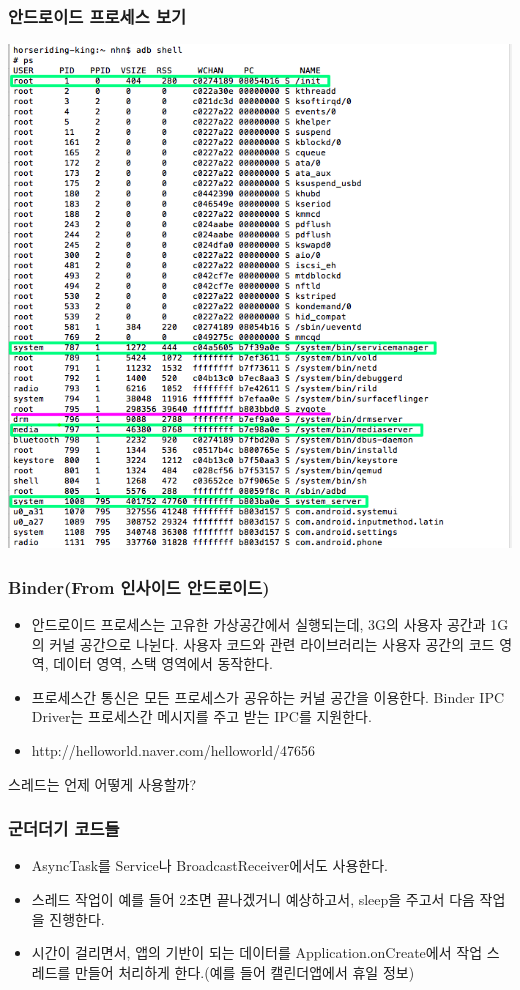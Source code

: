 \documentclass{beamer}
\begin{document}
\begin{frame}
\frametitle{안드로이드 프로세스 보기}
\includegraphics[scale=0.3]{ps}
\end{frame}

\begin{frame}
\frametitle{Binder(From 인사이드 안드로이드)}
\begin{itemize}
\item 안드로이드 프로세스는 고유한 가상공간에서 실행되는데, 3G의 사용자 공간과 1G의 커널 공간으로 나뉜다. 사용자 코드와 관련 라이브러리는 사용자 공간의 코드 영역, 데이터 영역, 스택 영역에서 동작한다.
\item 프로세스간 통신은 모든 프로세스가 공유하는 커널 공간을 이용한다. Binder IPC Driver는 프로세스간 메시지를 주고 받는 IPC를 지원한다. 
\item http://helloworld.naver.com/helloworld/47656
\end{itemize}
\end{frame}

\begin{frame}
스레드는 언제 어떻게 사용할까?
\end{frame}

\begin{frame}
\frametitle{군더더기 코드들}
\begin{itemize}
\item AsyncTask를 Service나 BroadcastReceiver에서도 사용한다. 
\item 스레드 작업이 예를 들어 2초면 끝나겠거니 예상하고서, sleep을 주고서 다음 작업을 진행한다.
\item 시간이 걸리면서, 앱의 기반이 되는 데이터를 Application.onCreate에서 작업 스레드를 만들어 처리하게 한다.(예를 들어 캘린더앱에서 휴일 정보)
\end{itemize}
\end{frame}
\end{document}
